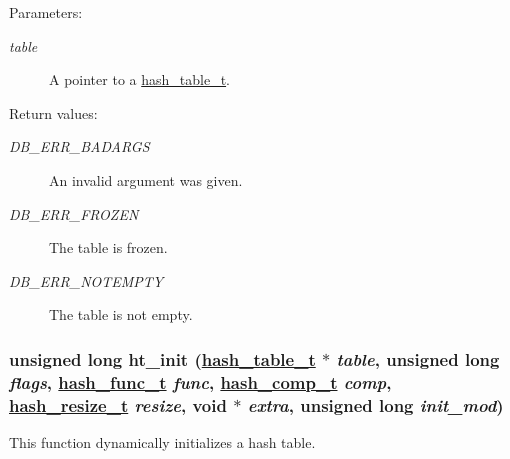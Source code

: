 \begin{Desc}
\item[Parameters:]
\begin{description}
\item[{\em table}]A pointer to a \hyperlink{group__dbprim__hash_a0}{hash\_\-table\_\-t}.\end{description}
\end{Desc}
\begin{Desc}
\item[Return values:]
\begin{description}
\item[{\em DB\_\-ERR\_\-BADARGS}]An invalid argument was given. \item[{\em DB\_\-ERR\_\-FROZEN}]The table is frozen. \item[{\em DB\_\-ERR\_\-NOTEMPTY}]The table is not empty. \end{description}
\end{Desc}
\hypertarget{group__dbprim__hash_a6}{
\subsubsection[ht\_\-init]{\setlength{\rightskip}{0pt plus 5cm}unsigned long ht\_\-init (\hyperlink{dbprim_8h_a0}{hash\_\-table\_\-t} $\ast$ {\em table}, unsigned long {\em flags}, \hyperlink{dbprim_8h_a3}{hash\_\-func\_\-t} {\em func}, \hyperlink{dbprim_8h_a4}{hash\_\-comp\_\-t} {\em comp}, \hyperlink{dbprim_8h_a5}{hash\_\-resize\_\-t} {\em resize}, void $\ast$ {\em extra}, unsigned long {\em init\_\-mod})}}
\label{group__dbprim__hash_a6}


This function dynamically initializes a hash table.

